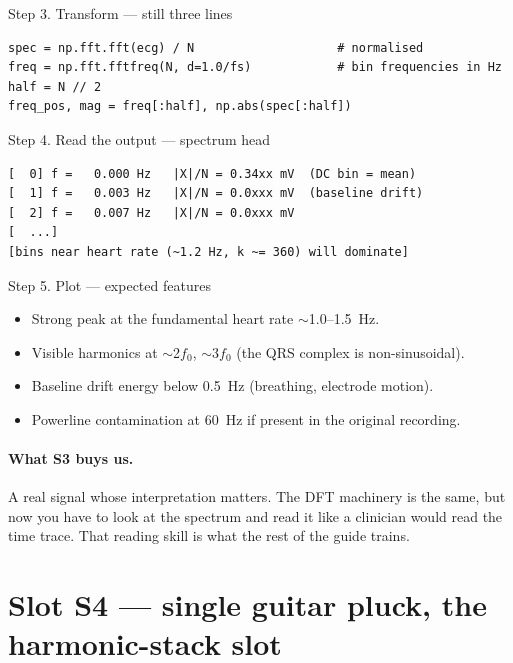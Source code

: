 \documentclass[11pt,a4paper,openany]{book}
\begin{document}
\begin{pipelinestep}{Step 3. Transform --- still three lines}
\begin{lstlisting}[style=shadpython]
spec = np.fft.fft(ecg) / N                    # normalised
freq = np.fft.fftfreq(N, d=1.0/fs)            # bin frequencies in Hz
half = N // 2
freq_pos, mag = freq[:half], np.abs(spec[:half])
\end{lstlisting}
\end{pipelinestep}

\begin{pipelinestep}{Step 4. Read the output --- spectrum head}
\begin{lstlisting}[style=shaddata]
[  0] f =   0.000 Hz   |X|/N = 0.34xx mV  (DC bin = mean)
[  1] f =   0.003 Hz   |X|/N = 0.0xxx mV  (baseline drift)
[  2] f =   0.007 Hz   |X|/N = 0.0xxx mV
[  ...]
[bins near heart rate (~1.2 Hz, k ~= 360) will dominate]
\end{lstlisting}
\end{pipelinestep}

\begin{pipelinestep}{Step 5. Plot --- expected features}
\begin{itemize}[leftmargin=*,itemsep=0pt]
\item Strong peak at the fundamental heart rate $\sim$1.0--1.5~Hz.
\item Visible harmonics at $\sim$2$f_0$, $\sim$3$f_0$ (the QRS complex is non-sinusoidal).
\item Baseline drift energy below 0.5~Hz (breathing, electrode motion).
\item Powerline contamination at 60~Hz if present in the original recording.
\end{itemize}
\end{pipelinestep}

\paragraph{What S3 buys us.} A real signal whose interpretation
matters. The DFT machinery is the same, but now you have to look
at the spectrum and read it like a clinician would read the time
trace. That reading skill is what the rest of the guide trains.

\clearpage
\section{Slot S4 --- single guitar pluck, the harmonic-stack slot}
\label{sec:s4}
\end{document}
